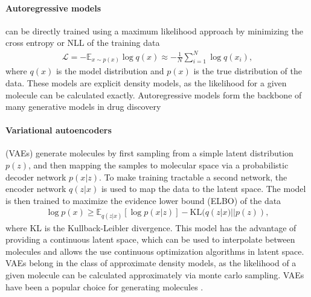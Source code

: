 \paragraph{Autoregressive models} can be directly trained using a maximum likelihood approach by
minimizing the cross entropy or \ac{NLL} of the training data
\begin{align}
      \mathcal{L} = - \mathbb{E}_{x \sim p(x)} \log q(x) \approx - \frac{1}{N} \sum_{i=1}^N \log q(x_i),
\end{align}
where $q(x)$ is the model distribution and $p(x)$ is the true distribution of the data. These models
are explicit density models, as the likelihood for a given molecule can be calculated exactly.
Autoregressive models form the backbone of many generative models in drug discovery
\citep{gomez-bombarelliAutomaticChemicalDesign2018,seglerGeneratingFocusedMolecule2018,olivecronaMolecularDenovoDesign2017,guoAugmentedMemoryCapitalizing2023,thomasAugmentedHillClimbIncreases2022,jaquesSequenceTutorConservative2016,cohen-karlikOvercomingOrderAutoregressive2024,}

\paragraph{Variational autoencoders} (VAEs) \citep{kingmaAutoEncodingVariationalBayes2013} generate molecules by first
sampling from a simple latent distribution $p(z)$, and then mapping the samples to molecular space
via a probabilistic decoder network $p(x|z)$. To make training tractable a second network, the
encoder network $q(z|x)$ is used to map the data to the latent space. The model is then trained to
maximize the evidence lower bound (ELBO) of the data
\begin{align}
      \log p(x) \geq \mathbb{E}_{q(z|x)}[\log p(x|z)] - \text{KL}(q(z|x) || p(z)),
\end{align}
where KL is the Kullback-Leibler divergence. This model has the advantage of providing a continuous
latent space, which can be used to interpolate between molecules and allows the use continuous
optimization algorithms in latent space. VAEs belong in the class of approximate density models, as
the likelihood of a given molecule can be calculated approximately via monte carlo sampling. VAEs
have been a popular choice for generating molecules
\citep{gomez-bombarelliAutomaticChemicalDesign2018,kusnerGrammarVariationalAutoencoder2017,simonovskyGraphVAEGenerationSmall2018,samantaNeVAEDeepGenerative2018,jinJunctionTreeVariational2018,daiSyntaxDirectedVariationalAutoencoder2018}.


